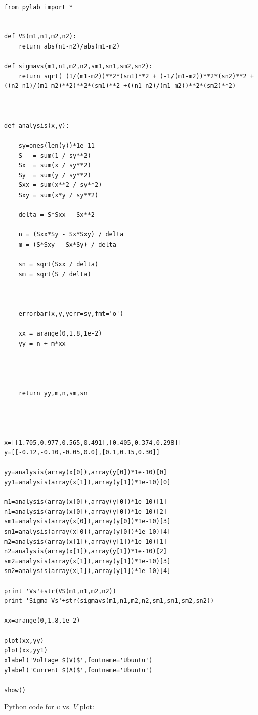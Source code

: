 \documentclass[aps,nofootinbib,onecolumn,groupedaddress,a4paper]{revtex4}
\begin{document}
\begin{lstlisting}

from pylab import *


def VS(m1,n1,m2,n2):
	return abs(n1-n2)/abs(m1-m2)

def sigmavs(m1,n1,m2,n2,sm1,sn1,sm2,sn2):
	return sqrt( (1/(m1-m2))**2*(sn1)**2 + (-1/(m1-m2))**2*(sn2)**2 + ((n2-n1)/(m1-m2)**2)**2*(sm1)**2 +((n1-n2)/(m1-m2))**2*(sm2)**2)



def analysis(x,y):

	sy=ones(len(y))*1e-11
	S   = sum(1 / sy**2)
	Sx  = sum(x / sy**2)
	Sy  = sum(y / sy**2)
	Sxx = sum(x**2 / sy**2)
	Sxy = sum(x*y / sy**2)

	delta = S*Sxx - Sx**2

	n = (Sxx*Sy - Sx*Sxy) / delta
	m = (S*Sxy - Sx*Sy) / delta

	sn = sqrt(Sxx / delta)
	sm = sqrt(S / delta)



	errorbar(x,y,yerr=sy,fmt='o')

	xx = arange(0,1.8,1e-2)
	yy = n + m*xx


	

	return yy,m,n,sm,sn

	


x=[[1.705,0.977,0.565,0.491],[0.405,0.374,0.298]]
y=[[-0.12,-0.10,-0.05,0.0],[0.1,0.15,0.30]]

yy=analysis(array(x[0]),array(y[0])*1e-10)[0]
yy1=analysis(array(x[1]),array(y[1])*1e-10)[0]

m1=analysis(array(x[0]),array(y[0])*1e-10)[1]
n1=analysis(array(x[0]),array(y[0])*1e-10)[2]
sm1=analysis(array(x[0]),array(y[0])*1e-10)[3]
sn1=analysis(array(x[0]),array(y[0])*1e-10)[4]
m2=analysis(array(x[1]),array(y[1])*1e-10)[1]
n2=analysis(array(x[1]),array(y[1])*1e-10)[2]
sm2=analysis(array(x[1]),array(y[1])*1e-10)[3]
sn2=analysis(array(x[1]),array(y[1])*1e-10)[4]

print 'Vs'+str(VS(m1,n1,m2,n2))
print 'Sigma Vs'+str(sigmavs(m1,n1,m2,n2,sm1,sn1,sm2,sn2))

xx=arange(0,1.8,1e-2)

plot(xx,yy)
plot(xx,yy1)
xlabel('Voltage $(V)$',fontname='Ubuntu')
ylabel('Current $(A)$',fontname='Ubuntu')

show()

\end{lstlisting}


Python code for $\upsilon$ vs. $V$ plot:
\end{document}
